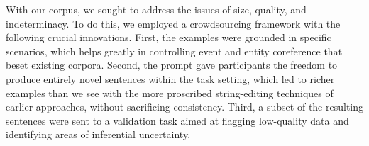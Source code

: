\noindent{}

With our corpus, we sought to address the issues of size, quality, and
indeterminacy. To do this, we employed a crowdsourcing framework with
the following crucial innovations. First, the examples were grounded
in specific scenarios, which helps greatly in controlling event and
entity coreference that beset existing corpora. Second, the prompt
gave participants the freedom to produce entirely novel sentences
within the task setting, which led to richer examples than we see with
the more proscribed string-editing techniques of earlier approaches,
without sacrificing consistency. Third, a subset of the resulting
sentences were sent to a validation task aimed at flagging low-quality
data and identifying areas of inferential uncertainty.






